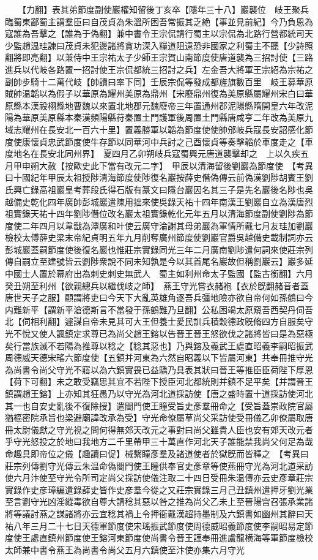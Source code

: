 　　【力翻】表其弟節度副使巖權知留後丁亥卒【隱年三十八】巖襲位　岐王聚兵臨蜀東鄙蜀主謂羣臣曰自茂貞為朱溫所困吾常振其乏絶【事並見前紀】今乃負恩為寇誰為吾擊之【誰為于偽翻】兼中書令王宗侃請行蜀主以宗侃為北路行營都統司天少監趙温珪諫曰茂貞未犯邊諸將貪功深入糧道阻遠恐非國家之利蜀主不聽【少詩照翻將即亮翻】以兼侍中王宗祐太子少師王宗賀山南節度使唐道襲為三招討使【三路進兵以代岐各路置一招討使王宗侃都統三招討之兵】左金吾大將軍王宗紹為宗祐之副帥步騎十二萬代岐【帥讀曰率下同】壬辰宗侃等發成都旌旗數百里　岐王募華原賊帥温韜以為假子以華原為耀州美原為鼎州【宋廢鼎州復為美原縣屬耀州宋白曰華原縣本漢祋栩縣地曹魏以來置北地郡元魏廢帝三年置通州郡泥陽縣隋開皇六年改泥陽為華原美原縣本秦漢頻陽縣苻秦置土門護軍後周置土門縣唐咸亨二年改為美原九域志耀州在長安北一百六十里】置義勝軍以韜為節度使使帥邠岐兵寇長安詔感化節度使康懷貞忠武節度使牛存節以同華河中兵討之己酉懷貞等奏擊韜於車度走之【車度地名在長安北同州界】　夏四月乙卯朔岐兵寇蜀興元唐道襲擊却之　上以久疾五月甲申朔大赦【按歐史此下當有改元二字】　甲辰以清海留後劉巖為節度使　【考異曰十國紀年甲辰太祖授陟清海節度使陟復名巖按薛史僭偽傳云前偽漢劉陟胡賓王劉氏興亡錄高祖巖皇考葬段氏得石版有篆文曰隱台巖因名其三子是先名巖後名陟也吳越備史乾化四年廣帥彭城巖遣陳用拙來使吳錄天祐十四年南漢王劉巖自立為漢唐烈祖實錄天祐十四年劉陟僭位改名巖太祖實錄乾化元年五月以清海節度副使劉陟為節度使二年四月以韋戩為潭廣和叶使云廣守淪謝其母弟巖為軍情所戴七月友珪加劉巖檢校太傅薛史梁末帝紀貞明五年九月削奪廣州節度使劉巖官爵吳越備史載制詞亦云彭城巖蓋嗣節度使後復名巖也惟莊宗實錄同光三年二月廣南劉陟遣何詞來使莊宗列傳自嗣立至建號皆云劉陟衆說不同未知孰是今以其首尾名巖故但稱劉巖云】巖多延中國士人置於幕府出為刺史刺史無武人　蜀主如利州命太子監國【監古銜翻】六月癸丑朔至利州【欲親總兵以繼伐岐之師】　燕王守光嘗衣赭袍【衣於旣翻赭音者蓋唐世天子之服】顧謂將吏曰今天下大亂英雄角逐吾兵彊地險亦欲自帝何如孫鶴曰今内難新平【謂新平滄德斯言不當發于孫鶴難乃旦翻】公私困竭太原窺吾西契丹伺吾北【伺相利翻】遽謀自帝未見其可大王但養士愛民訓兵積穀德政旣脩四方自服矣守光不悅又使人諷鎮定求尊已為尚父趙王鎔以告晉王晉王怒欲伐之諸將皆曰是為惡極矣行當族滅不若陽為推尊以稔之【稔其惡也】乃與鎔及義武王處直昭義李嗣昭振武周德威天德宋瑤六節度使【五鎮并河東為六然自昭義以下皆屬河東】共奉冊推守光為尚書令尚父守光不寤以為六鎮實畏已益驕乃具表其狀曰晉王等推臣臣荷陛下厚恩【荷下可翻】未之敢受竊思其宜不若陛下授臣河北都統則并鎮不足平矣【并謂晉王鎮謂趙王鎔】上亦知其狂愚乃以守光為河北道採訪使【唐之盛時置十道採訪使河北其一也自安史亂後不復除授】遣閤門使王瞳受旨史彥羣冊命之【受旨蓋崇政院官屬猶樞密院承旨也梁避廟諱改承為受】守光命僚屬草尚父采訪使受冊儀乙卯僚屬取唐冊太尉儀獻之守光視之問何得無郊天改元之事對曰尚父雖貴人臣也安有郊天改元者乎守光怒投之於地曰我地方二千里帶甲三十萬直作河北天子誰能禁我尚父何足為哉命趣具即帝位之儀【趣讀曰促】械繫瞳彥羣及諸道使者於獄旣而皆釋之　【考異曰莊宗列傳劉守光傳云朱温命偽閤門使王瞳供奉官史彥章等使燕冊守光為河北道采訪使六月汴使至守光令所司定尚父採訪使儀注取二十四日受冊朱温傳亦云史彥章莊宗實錄作史彦璋編遺錄薛史皆作史彦羣今從之又莊宗實錄三月己丑鎮州遣押牙劉光業至言劉守光凶淫縱毒欲自尊大請稔其惡以咎之推為尚父乙未上至晉陽宫召張承業諸將等議討燕之謀諸將亦云宜稔其禍上令押衙戴漢超持墨制及六鎮書如幽州其辭曰天祐八年三月二十七日天德軍節度使宋瑤振武節度使周德威昭義節度使李嗣昭易定節度使王處直鎮州節度使王鎔河東節度使尚書令晉王謹奉冊進盧龍横海等軍節度檢校太師兼中書令燕王為尚書令尚父五月六鎮使至汴使亦集六月守光